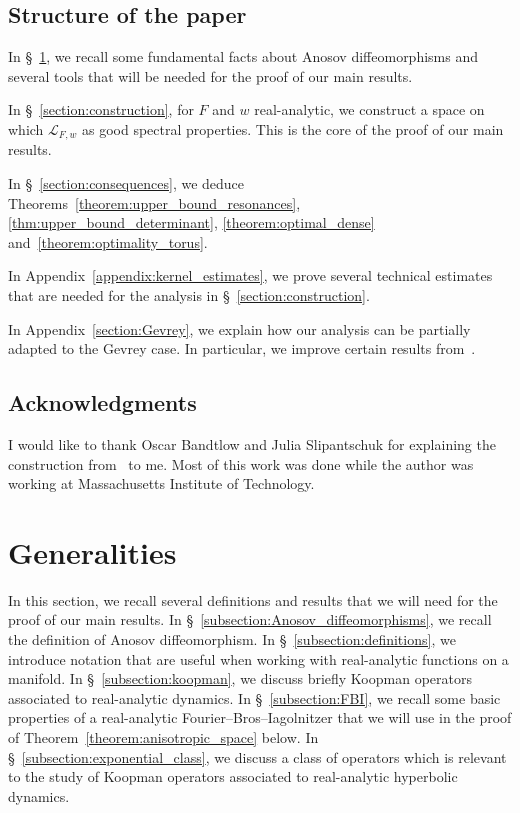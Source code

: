 \documentclass[AHL,Unicode,longabstracts,published]{cedram}
\newcommand{\clL}{\mathcal{L}}
\begin{document}
\subsection{Structure of the paper}

In \S~\ref{section:generalities}, we recall some fundamental facts about Anosov diffeomorphisms and several tools that will be needed for the proof of our main results.

In \S~\ref{section:construction}, for $F$ and $w$ real-analytic, we construct a space on which $\clL_{F,w}$ as good spectral properties. This is the core of the proof of our main results.

In \S~\ref{section:consequences}, we deduce Theorems~\ref{theorem:upper_bound_resonances}, \ref{thm:upper_bound_determinant}, \ref{theorem:optimal_dense} and~\ref{theorem:optimality_torus}.

In Appendix~\ref{appendix:kernel_estimates}, we prove several technical estimates that are needed for the analysis in \S~\ref{section:construction}.

In Appendix~\ref{section:Gevrey}, we explain how our analysis can be partially adapted to the Gevrey case. In particular, we improve certain results from~\cite{local_and_global}.

\subsection*{Acknowledgments}

I would like to thank Oscar Bandtlow and Julia Slipantschuk for explaining the construction from~\cite{optimal_examples} to me. Most of this work was done while the author was working at Massachusetts Institute of Technology.

\section{Generalities}\label{section:generalities}

In this section, we recall several definitions and results that we will need for the proof of our main results. In \S~\ref{subsection:Anosov_diffeomorphisms}, we recall the definition of Anosov diffeomorphism. In \S~\ref{subsection:definitions}, we introduce notation that are useful when working with real-analytic functions on a manifold. In \S~\ref{subsection:koopman}, we discuss briefly Koopman operators associated to real-analytic dynamics. In \S~\ref{subsection:FBI}, we recall some basic properties of a real-analytic Fourier--Bros--Iagolnitzer that we will use in the proof of Theorem~\ref{theorem:anisotropic_space} below. In \S~\ref{subsection:exponential_class}, we discuss a class of operators which is relevant to the study of Koopman operators associated to real-analytic hyperbolic dynamics.
\end{document}
